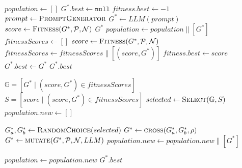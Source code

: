 \begin{algorithm*}[h]
\caption{\NAME}
\label{algo:ldhga}
\begin{algorithmic}[1]
    \State $population \gets []$ 
    \State $G^*.best \gets \texttt{null}$ 
    \State $fitness.best \gets -1$ 
        \State $prompt \gets \textsc{PromptGenerator}$ 
        \State $G^* \gets LLM(prompt)$ 
        \State $score \gets \textsc{Fitness}(G^*, \mathcal{P}, \mathcal{N})$ 
            \State \Return $G^*$ 
        \EndIf
        \State $population \gets population \parallel [G^*]$ 
    \EndFor
        \State $fitnessScores \gets []$ 
            \State $score \gets \textsc{Fitness}(G^*, \mathcal{P}, \mathcal{N})$
            \State $fitnessScores \gets fitnessScores \parallel [(score, G^*)]$ 
                \State $fitness.best \gets score$
                \State $G^*.best \gets G^*$
            \EndIf
        \EndFor
                \State \Return $G^*.best$  
        \EndIf

        \State $\mathbb{G} = [G^* \mid (score, G^*) \in fitnessScores]$
        \State $S = [score \mid (score,G^*) \in fitnessScores]$
        \State $selected \gets \textsc{Select}(\mathbb{G},S)$
        \State $population.new \gets []$

            \State $ G^*_a,G^*_b \gets \textsc{RandomChoice}(selected)$
            \State $G^* \gets \textsc{cross}(G^*_a,G^*_b, \rho)$
                \State $G^* \gets \textsc{mutate}(G^* ,\mathcal{P}, \mathcal{N}, LLM)$
            \EndIf
            \State $population.new \gets population.new \parallel [G^*]$
        \EndWhile
        
        \State $population \gets population.new$ 
    \EndFor
    \Return $G^*.best$
\EndProcedure
\end{algorithmic}
\end{algorithm*}


